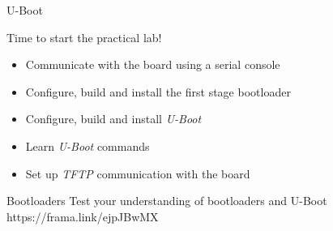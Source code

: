 \setuplabframe
{U-Boot}
{
  Time to start the practical lab!
  \begin{itemize}
  \item Communicate with the board using a serial console
  \item Configure, build and install the first stage bootloader
  \item Configure, build and install {\em U-Boot}
  \item Learn {\em U-Boot} commands
  \item Set up {\em TFTP} communication with the board
  \end{itemize}
}

\quizframe
{Bootloaders}
{Test your understanding of bootloaders and U-Boot}
{https://frama.link/ejpJBwMX}

